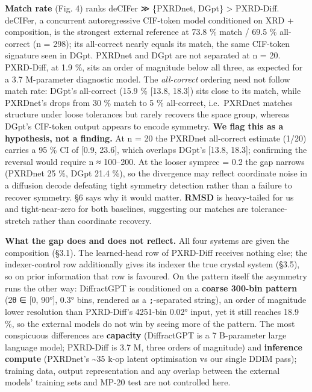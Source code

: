 \documentclass[
  11pt,
]{article}
\begin{document}
\textbf{Match rate} (Fig. 4) ranks deCIFer ≫ \{PXRDnet, DGpt\}
\textgreater{} PXRD-Diff. deCIFer, a concurrent autoregressive CIF-token
model conditioned on XRD + composition, is the strongest external
reference at 73.8 \% match / 69.5 \% all-correct (n = 298); its
all-correct nearly equals its match, the same CIF-token signature seen
in DGpt. PXRDnet and DGpt are not separated at n = 20. PXRD-Diff, at 1.9
\%, sits an order of magnitude below all three, as expected for a 3.7
M-parameter diagnostic model. The \emph{all-correct} ordering need not
follow match rate: DGpt's all-correct (15.9 \% {[}13.8, 18.3{]}) sits
close to its match, while PXRDnet's drops from 30 \% match to 5 \%
all-correct, i.e.~PXRDnet matches structure under loose tolerances but
rarely recovers the space group, whereas DGpt's CIF-token output appears
to encode symmetry. \textbf{We flag this as a hypothesis, not a
finding.} At n = 20 the PXRDnet all-correct estimate (1/20) carries a 95
\% CI of {[}0.9, 23.6{]}, which overlaps DGpt's {[}13.8, 18.3{]};
confirming the reversal would require n ≈ 100--200. At the looser
symprec = 0.2 the gap narrows (PXRDnet 25 \%, DGpt 21.4 \%), so the
divergence may reflect coordinate noise in a diffusion decode defeating
tight symmetry detection rather than a failure to recover symmetry. §6
says why it would matter. \textbf{RMSD} is heavy-tailed for us and
tight-near-zero for both baselines, suggesting our matches are
tolerance-stretch rather than coordinate recovery.

\textbf{What the gap does and does not reflect.} All four systems are
given the composition (§3.1). The learned-head row of PXRD-Diff receives
nothing else; the indexer-control row additionally gives its indexer the
true crystal system (§3.5), so on prior information that row is
favoured. On the pattern itself the asymmetry runs the other way:
DiffractGPT is conditioned on a \textbf{coarse 300-bin pattern} (2θ ∈
{[}0, 90°{]}, 0.3° bins, rendered as a \texttt{;}-separated string), an
order of magnitude lower resolution than PXRD-Diff's 4251-bin 0.02°
input, yet it still reaches 18.9 \%, so the external models do not win
by seeing more of the pattern. The most conspicuous differences are
\textbf{capacity} (DiffractGPT is a 7 B-parameter large language model;
PXRD-Diff is 3.7 M, three orders of magnitude) and \textbf{inference
compute} (PXRDnet's \textasciitilde35 k-op latent optimisation vs our
single DDIM pass); training data, output representation and any overlap
between the external models' training sets and MP-20 test are not
controlled here.
\end{document}
